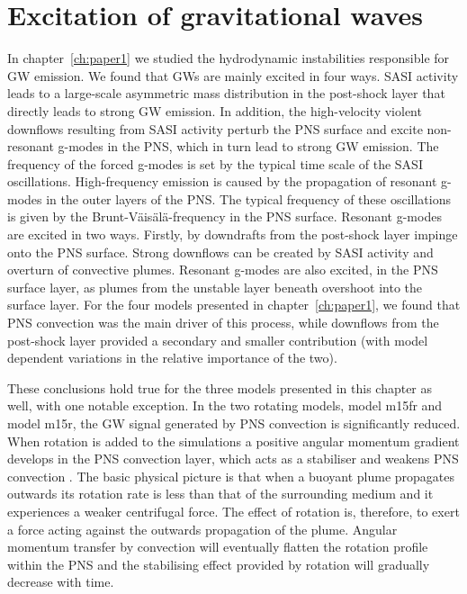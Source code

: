 \section{Excitation of gravitational waves} \label{sec:p2ext}
In chapter~\ref{ch:paper1} we studied the hydrodynamic instabilities responsible for GW emission.
We found that GWs are mainly excited in four ways. SASI activity leads to a large-scale asymmetric mass 
distribution in the post-shock layer that directly leads to strong GW emission. In addition, the high-velocity 
violent downflows resulting from SASI activity perturb the PNS surface and excite non-resonant g-modes in the PNS,
which in turn lead to strong GW emission. The frequency of the forced g-modes 
is set by the typical time scale of the SASI oscillations. High-frequency emission is caused by the propagation of
resonant g-modes in the outer layers of the PNS. The typical frequency of these oscillations is given by the
Brunt-V\"{a}is\"{a}l\"{a}-frequency in the PNS surface. Resonant g-modes are excited in two ways.
Firstly, by downdrafts from the post-shock layer impinge onto the PNS surface. Strong downflows can be created by SASI 
activity and overturn of convective plumes. Resonant g-modes are also excited, in the PNS surface layer,
as plumes from the unstable layer beneath overshoot into the surface layer.
For the four models presented in chapter~\ref{ch:paper1}, we found that PNS convection was the main driver
of this process, while downflows from the post-shock layer provided a secondary and smaller
contribution (with model dependent variations in the relative importance of the two).

These conclusions hold true for the three models presented in this chapter as well, with one notable
exception. In the two rotating models, model m15fr and model m15r, the GW signal generated by PNS 
convection is significantly reduced. When rotation is added to the simulations a positive
angular momentum gradient develops in the PNS convection layer, which acts as a stabiliser and weakens PNS
convection \citep{janka_01b}. 
The basic physical picture is that when a buoyant plume propagates outwards its rotation rate
is less than that of the surrounding medium and it experiences a weaker centrifugal force.
The effect of rotation is, therefore, to exert a force acting against the outwards propagation of the plume.
Angular momentum transfer by convection will eventually flatten the rotation profile within the PNS and 
the stabilising effect provided by rotation will gradually decrease with time.

